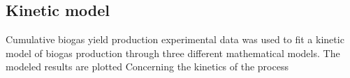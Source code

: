 \subsection{Kinetic model}
Cumulative biogas yield production experimental data was used to fit a kinetic model of biogas production through three different mathematical models. The modeled results are plotted 
Concerning the kinetics of the process